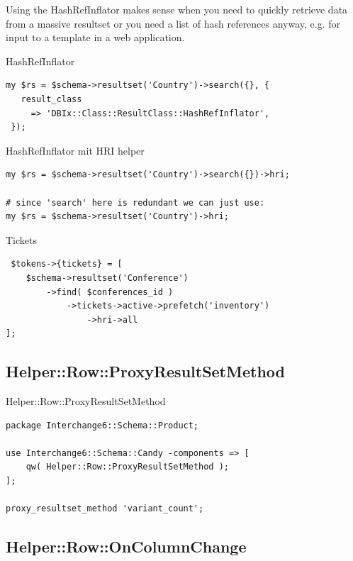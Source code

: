 Using the HashRefInflator makes sense when you need to quickly retrieve
data from a massive resultset or you need a list of hash references anyway,
e.g. for input to a template in a web application.

\begin{frame}[fragile]{HashRefInflator}
\begin{lstlisting}
my $rs = $schema->resultset('Country')->search({}, {
   result_class
     => 'DBIx::Class::ResultClass::HashRefInflator',
 });
\end{lstlisting}
\end{frame}

\begin{frame}[fragile]{HashRefInflator mit HRI helper}
\begin{lstlisting}
my $rs = $schema->resultset('Country')->search({})->hri;

# since 'search' here is redundant we can just use:
my $rs = $schema->resultset('Country')->hri;
\end{lstlisting}
\end{frame}

\begin{frame}[fragile]{Tickets}
\begin{lstlisting}
 $tokens->{tickets} = [
    $schema->resultset('Conference')
        ->find( $conferences_id )
            ->tickets->active->prefetch('inventory')
                ->hri->all 
];
\end{lstlisting}
\end{frame}

\subsection{Helper::Row::ProxyResultSetMethod}

\begin{frame}[fragile]{Helper::Row::ProxyResultSetMethod}
\begin{lstlisting}
package Interchange6::Schema::Product;

use Interchange6::Schema::Candy -components => [
    qw( Helper::Row::ProxyResultSetMethod );
];

proxy_resultset_method 'variant_count';
\end{lstlisting}
\end{frame}

\subsection{Helper::Row::OnColumnChange}

